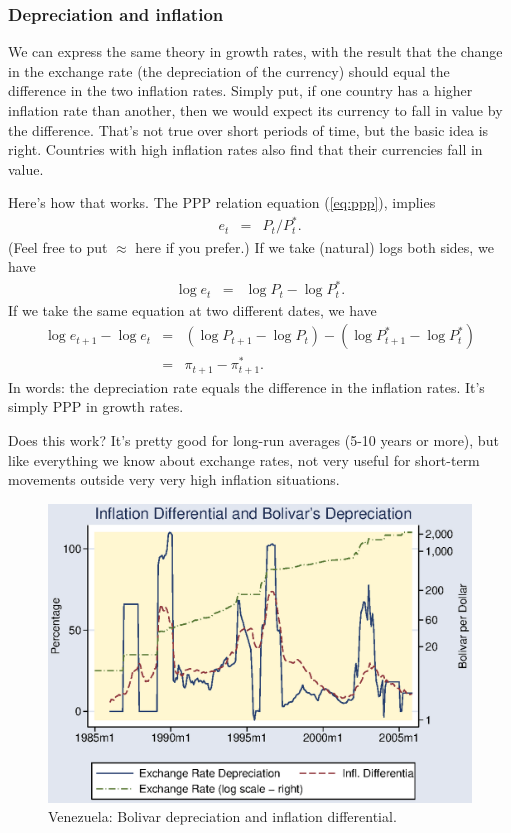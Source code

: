 \documentclass[letterpaper,12pt]{article}
\begin{document}
\subsubsection*{Depreciation and inflation}

We can express the same theory in growth rates, 
with the result that the change in the exchange rate 
(the depreciation of the currency)
should equal the difference in the two inflation rates.
Simply put, 
if one country has a higher inflation rate than another, 
then we would expect its currency to fall in value
by the difference.  
That's not true over short periods of time, 
but the basic idea is right.
Countries with high inflation rates also find
that their currencies fall in value.  

Here's how that works.  
The PPP relation  equation (\ref{eq:ppp}), implies 
\begin{eqnarray*}
    e_t &=& P_t/P_t^* .
\end{eqnarray*}
(Feel free to put $\approx$ here if you prefer.)  
If we take (natural) logs both sides, we have 
\begin{eqnarray*}
    \log e_t &=& \log P_t - \log P_t^* .
\end{eqnarray*}
If we take the same equation at two different dates, 
we have 
\begin{eqnarray*}
    \log e_{t+1}-\log e_{t} &=& 
        (\log P_{t+1}-\log P_{t}) - (\log P^{*}_{t+1}-\log P^{*}_{t}) \\
                &=& \pi_{t+1} - \pi^*_{t+1} .
\end{eqnarray*}
In words:  the depreciation rate equals the difference in the inflation rates.  
It's simply PPP in growth rates.  


Does this work?  
It's pretty good for long-run averages (5-10 years or more), 
but like everything we know about exchange rates, 
not very useful for short-term movements outside very 
very high inflation situations.  

\begin{figure}[h]
    \centering
    \includegraphics[scale=1.0]{venezuela.eps}
    \caption{Venezuela: Bolivar depreciation and inflation differential.}
    \label{fig:venezuela}
\end{figure}
\end{document}
